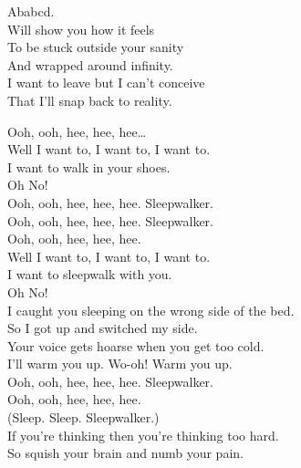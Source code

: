



Ababcd. \\
Will show you how it feels \\
To be stuck outside your sanity \\
And wrapped around infinity. \\
I want to leave but I can't conceive \\
That I'll snap back to reality. \\





Ooh, ooh, hee, hee, hee… \\

Well I want to, I want to, I want to. \\
I want to walk in your shoes. \\
Oh No! \\

Ooh, ooh, hee, hee, hee. Sleepwalker. \\
Ooh, ooh, hee, hee, hee. Sleepwalker. \\
Ooh, ooh, hee, hee, hee. \\
Well I want to, I want to, I want to. \\
I want to sleepwalk with you. \\
Oh No! \\

I caught you sleeping on the wrong side of the bed. \\
So I got up and switched my side. \\
Your voice gets hoarse when you get too cold. \\
I'll warm you up. Wo-oh! Warm you up. \\

Ooh, ooh, hee, hee, hee. Sleepwalker. \\
Ooh, ooh, hee, hee, hee. \\
(Sleep. Sleep. Sleepwalker.) \\

If you're thinking then you're thinking too hard. \\
So squish your brain and numb your pain. \\

